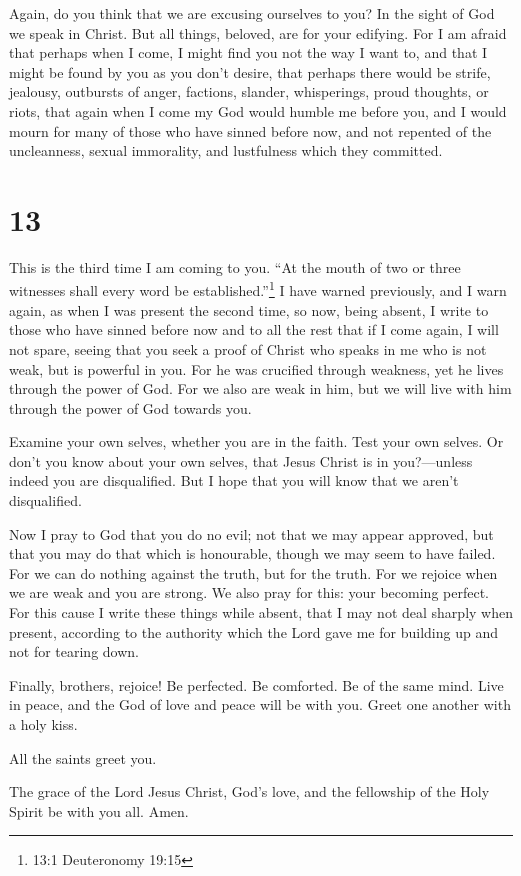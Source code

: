  Again, do you think that we are excusing ourselves to you?
In the sight of God we speak in Christ. But all things, beloved, are for
your edifying.  For I am afraid that perhaps when I come, I
might find you not the way I want to, and that I might be found by you
as you don't desire, that perhaps there would be strife, jealousy,
outbursts of anger, factions, slander, whisperings, proud thoughts, or
riots,  that again when I come my God would humble me
before you, and I would mourn for many of those who have sinned before
now, and not repented of the uncleanness, sexual immorality, and
lustfulness which they committed.

\hypertarget{section-12}{%
\section{13}\label{section-12}}

 This is the third time I am coming to you. ``At the mouth
of two or three witnesses shall every word be established.''\footnote{13:1
  Deuteronomy 19:15}  I have warned previously, and I warn
again, as when I was present the second time, so now, being absent, I
write to those who have sinned before now and to all the rest that if I
come again, I will not spare,  seeing that you seek a proof
of Christ who speaks in me who is not weak, but is powerful in you.
 For he was crucified through weakness, yet he lives through
the power of God. For we also are weak in him, but we will live with him
through the power of God towards you.

 Examine your own selves, whether you are in the faith. Test
your own selves. Or don't you know about your own selves, that Jesus
Christ is in you?---unless indeed you are disqualified.  But
I hope that you will know that we aren't disqualified.

 Now I pray to God that you do no evil; not that we may
appear approved, but that you may do that which is honourable, though we
may seem to have failed.  For we can do nothing against the
truth, but for the truth.  For we rejoice when we are weak
and you are strong. We also pray for this: your becoming perfect.
 For this cause I write these things while absent, that I
may not deal sharply when present, according to the authority which the
Lord gave me for building up and not for tearing down.

 Finally, brothers, rejoice! Be perfected. Be comforted. Be
of the same mind. Live in peace, and the God of love and peace will be
with you.  Greet one another with a holy kiss.

 All the saints greet you.

 The grace of the Lord Jesus Christ, God's love, and the
fellowship of the Holy Spirit be with you all. Amen.
